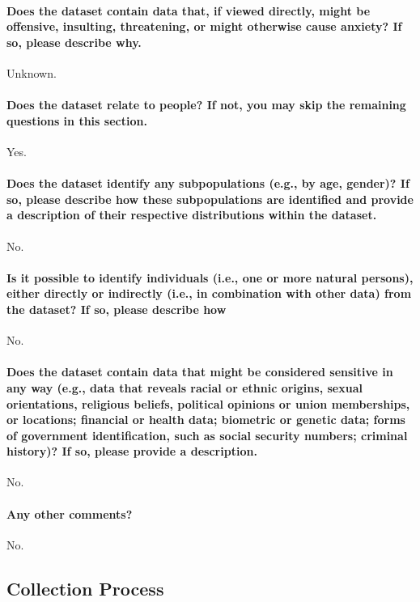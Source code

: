 \documentclass{article}
\begin{document}
\paragraph{Does the dataset contain data that, if viewed directly, might be offensive, insulting, threatening, or might otherwise cause anxiety? If so, please describe why.}
Unknown.

\paragraph{Does the dataset relate to people? If not, you may skip the remaining
questions in this section.}
Yes.

\paragraph{Does the dataset identify any subpopulations (e.g., by age, gender)? If so, please describe how these subpopulations are identified and
provide a description of their respective distributions within the dataset.}
No.

\paragraph{Is it possible to identify individuals (i.e., one or more natural persons), either directly or indirectly (i.e., in combination with other
data) from the dataset? If so, please describe how}
No.

\paragraph{Does the dataset contain data that might be considered sensitive
in any way (e.g., data that reveals racial or ethnic origins, sexual
orientations, religious beliefs, political opinions or union memberships, or locations; financial or health data; biometric or genetic data; forms of government identification, such as social security numbers; criminal history)? If so, please provide a description.}
No.

\paragraph{Any other comments?}
No.

\subsection{Collection Process}
\end{document}
